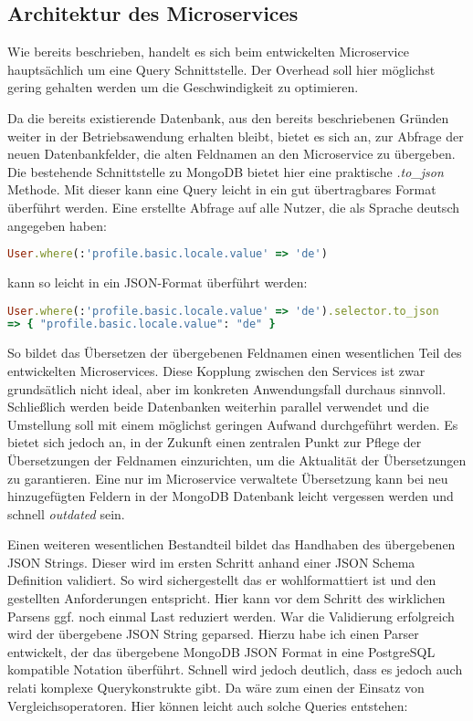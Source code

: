 
\subsection{Architektur des Microservices}
Wie bereits beschrieben, handelt es sich beim entwickelten Microservice hauptsächlich um eine Query Schnittstelle. Der Overhead soll hier möglichst gering gehalten werden um die Geschwindigkeit zu optimieren.

Da die bereits existierende Datenbank, aus den bereits beschriebenen Gründen weiter in der Betriebsawendung erhalten bleibt, bietet es sich an, zur Abfrage der neuen Datenbankfelder, die alten Feldnamen an den Microservice zu übergeben.
Die bestehende Schnittstelle zu MongoDB bietet hier eine praktische \textit{.to\_json} Methode. Mit dieser kann eine Query leicht in ein gut übertragbares Format überführt werden. Eine erstellte Abfrage auf alle Nutzer, die als Sprache deutsch angegeben haben:

\begin{lstlisting}[language=Ruby]
User.where(:'profile.basic.locale.value' => 'de')
\end{lstlisting}

\noindent kann so leicht in ein JSON-Format überführt werden:

\begin{lstlisting}[language=Ruby]
User.where(:'profile.basic.locale.value' => 'de').selector.to_json
=> { "profile.basic.locale.value": "de" }
\end{lstlisting}

\noindent So bildet das Übersetzen der übergebenen Feldnamen einen wesentlichen Teil des entwickelten Microservices.
Diese Kopplung zwischen den Services ist zwar grundsätlich nicht ideal, aber im konkreten Anwendungsfall durchaus sinnvoll. Schließlich werden beide Datenbanken weiterhin parallel verwendet und die Umstellung soll mit einem möglichst geringen Aufwand durchgeführt werden.
Es bietet sich jedoch an, in der Zukunft einen zentralen Punkt zur Pflege der Übersetzungen der Feldnamen einzurichten, um die Aktualität der Übersetzungen zu garantieren. Eine nur im Microservice verwaltete Übersetzung kann bei neu hinzugefügten Feldern in der MongoDB Datenbank leicht vergessen werden und schnell \textit{outdated} sein.

Einen weiteren wesentlichen Bestandteil bildet das Handhaben des übergebenen JSON Strings. Dieser wird im ersten Schritt anhand einer JSON Schema \cite{jsonschema} Definition validiert. So wird sichergestellt das er wohlformattiert ist und den gestellten Anforderungen entspricht. Hier kann vor dem Schritt des wirklichen Parsens ggf. noch einmal Last reduziert werden. War die Validierung erfolgreich wird der übergebene JSON String geparsed. Hierzu habe ich einen Parser entwickelt, der das übergebene MongoDB JSON Format in eine PostgreSQL kompatible Notation überführt. Schnell wird jedoch deutlich, dass es jedoch auch relati komplexe Querykonstrukte gibt. Da wäre zum einen der Einsatz von Vergleichsoperatoren. Hier können leicht auch solche Queries entstehen:

